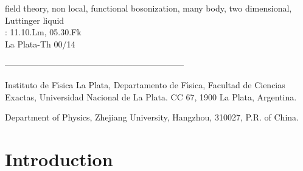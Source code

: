 \documentclass[a4paper,a4paper]{article}
\begin{document}
\vspace{3cm}  field theory, non local, functional
bosonization, many body, two dimensional, Luttinger liquid\\ :
11.10.Lm, 05.30.Fk\\ La Plata-Th 00/14

\noindent ---------------------------------------------------------------

\noindent {}\coordHE{} {\footnotesize Instituto de F\'{\i}sica La Plata, Departamento de
F\'{\i}sica, Facultad de Ciencias Exactas, Universidad Nacional de La Plata.  CC 67,
1900 La Plata, Argentina.}

\noindent {}\coordHE{} {\footnotesize Department of Physics, Zhejiang University, Hangzhou,
310027, P.R. of China.}


\newpage

\pagestyle{plain}


\section{Introduction}
\end{document}
